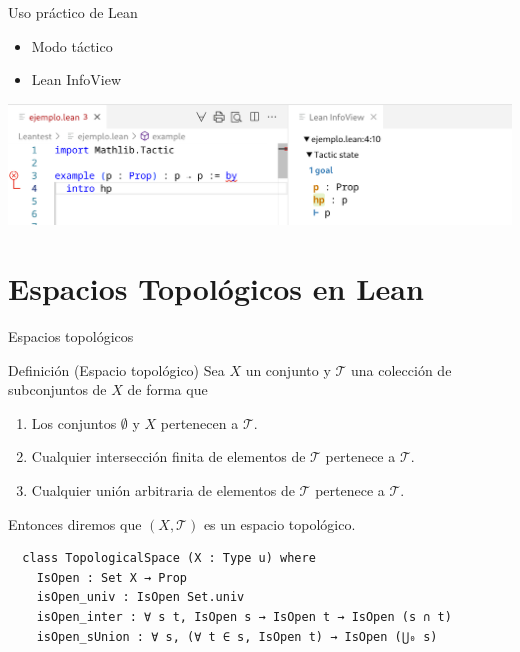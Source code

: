 \documentclass{beamer}
\begin{document}
\begin{frame}{Uso práctico de Lean}
  \begin{itemize}
    \item Modo táctico
    \item Lean InfoView
  \end{itemize}

  \hspace{1cm}

  \includegraphics[width=\linewidth]{figuras/infoview.png}
\end{frame}

\section{Espacios Topológicos en Lean}

\begin{frame}[fragile]{Espacios topológicos}
  \begin{block}{Definición (Espacio topológico)}
    Sea $X$ un conjunto y $\mathcal{T}$ una colección de subconjuntos de $X$ de forma que
    \begin{enumerate}
      \item Los conjuntos $\emptyset$ y $X$ pertenecen a $\mathcal{T}$.
      \item Cualquier intersección finita de elementos de $\mathcal{T}$ pertenece a $\mathcal{T}$.
      \item Cualquier unión arbitraria de elementos de $\mathcal{T}$ pertenece a $\mathcal{T}$.
    \end{enumerate}
    Entonces diremos que $(X, \mathcal{T})$ es un \textnormal{espacio topológico}.
  \end{block}

  \begin{lstlisting}
  class TopologicalSpace (X : Type u) where
    IsOpen : Set X → Prop
    isOpen_univ : IsOpen Set.univ
    isOpen_inter : ∀ s t, IsOpen s → IsOpen t → IsOpen (s ∩ t)
    isOpen_sUnion : ∀ s, (∀ t ∈ s, IsOpen t) → IsOpen (⋃₀ s) \end{lstlisting}
\end{frame}
\end{document}
